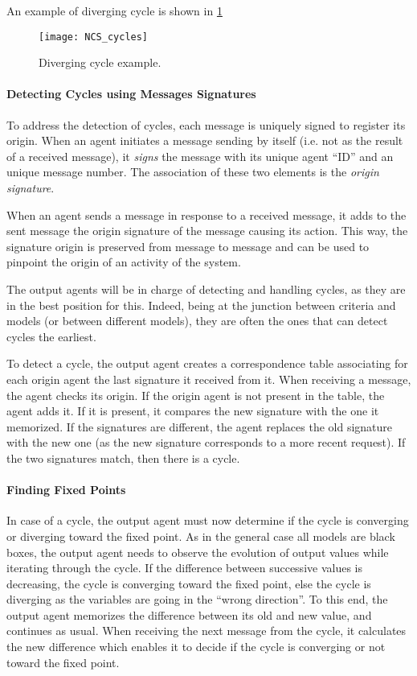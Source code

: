 An example of diverging cycle is shown in \figurename{} \ref{NCS_cycles_fig}

\begin{figure}
\centering
\texttt{[image: NCS\_cycles]}
\caption{Diverging cycle example.}\label{NCS_cycles_fig}
\end{figure}

\paragraph*{Detecting Cycles using Messages Signatures}
To address the detection of cycles, each message is uniquely signed to register its origin. When an agent initiates a message sending by itself (i.e. not as the result of a received message), it \emph{signs} the message with its unique agent \enquote{ID} and an unique message number. The association of these two elements is the \emph{origin signature}.

When an agent sends a message in response to a received message, it adds to the sent message the origin signature of the message causing its action. This way, the signature origin is preserved from message to message and can be used to pinpoint the origin of an activity of the system.

The output agents will be in charge of detecting and handling cycles, as they are in the best position for this. Indeed, being at the junction between criteria and models (or between different models), they are often the ones that can detect cycles the earliest.

To detect a cycle, the output agent creates a correspondence table associating for each origin agent the last signature it received from it. When receiving a message, the agent checks its origin. If the origin agent is not present in the table, the agent adds it. If it is present, it compares the new signature with the one it memorized. If the signatures are different, the agent replaces the old signature with the new one (as the new signature corresponds to a more recent request). If the two signatures match, then there is a cycle.

\paragraph*{Finding Fixed Points}
In case of a cycle, the output agent must now determine if the cycle is converging or diverging toward the fixed point. As in the general case all models are black boxes, the output agent needs to observe the evolution of output values while iterating through the cycle. If the difference between successive values is decreasing, the cycle is converging toward the fixed point, else the cycle is diverging as the variables are going in the \enquote{wrong direction}. To this end, the output agent memorizes the difference between its old and new value, and continues as usual. When receiving the next message from the cycle, it calculates the new difference which enables it to decide if the cycle is converging or not toward the fixed point.

